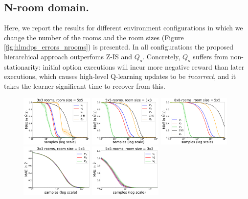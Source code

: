 \subsection{N-room domain.}
Here, we report the results for different environment configurations in which we change the number of the rooms and the room sizes (Figure \ref{fig:hlmdps_errors_nrooms}) is presented. In all configurations the proposed hierarchical approach outperfoms Z-IS and $Q_o$. Concretely, $Q_o$ suffers from non-stationarity: initial option executions will incur more negative reward than later executions, which causes high-level Q-learning updates to be {\em incorrect}, and it takes the learner significant time to recover from this.

\begin{figure}[!htb]
\centering
\includegraphics[width=0.32\textwidth]{figures/chapter1/learning/nrooms_3_3.png}
\includegraphics[width=0.32\textwidth]{figures/chapter1/learning/nrooms_5_5.png}
\includegraphics[width=0.32\textwidth]{figures/chapter1/learning/nrooms_8_8.png}
\includegraphics[width=0.32\textwidth]{figures/chapter1/subtasks/nrooms_3_3_subtasks.png}
\includegraphics[width=0.32\textwidth]{figures/chapter1/subtasks/nrooms_5_5_subtasks.png}

\end{figure}

